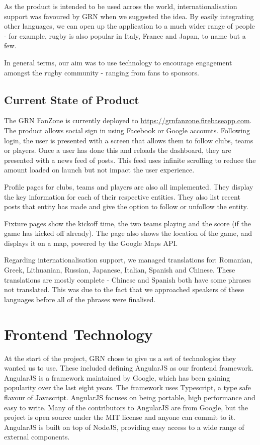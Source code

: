 \documentclass{l3proj}
\begin{document}
As the product is intended to be used across the world, internationalisation
 support was favoured by GRN when we suggested the idea. By easily integrating
 other languages, we can open up the application to a much wider range of people - for
 example, rugby is also popular in Italy, France and Japan, to name but a few.

In general terms, our aim was to use technology to encourage engagement amongst the
 rugby community - ranging from fans to sponsors.

\subsection{Current State of Product}
The GRN FanZone is currently deployed to \url{https://grnfanzone.firebaseapp.com}.
 The product allows social sign in using Facebook or Google accounts. Following
 login, the user is presented with a screen that allows them to follow clubs,
 teams or players. Once a user has done this and reloads the dashboard, they
 are presented with a news feed of posts. This feed uses infinite scrolling to 
 reduce the amount loaded on launch but not impact the user experience.
 
Profile pages for clubs, teams and players are also all implemented. They display
 the key information for each of their respective entities. They also list 
 recent posts that entity has made and give the option to follow or unfollow 
 the entity.
 
Fixture pages show the kickoff time, the two teams playing and the score (if the
 game has kicked off already). The page also shows the location of the game,
 and displays it on a map, powered by the Google Maps API.
 
Regarding internationalisation support, we managed translations for: Romanian,
 Greek, Lithuanian, Russian, Japanese, Italian, Spanish and Chinese. These 
 translations are mostly complete - Chinese and Spanish both have some phrases
 not translated. This was due to the fact that we approached speakers of these 
 languages before all of the phrases were finalised. 


\section{Frontend Technology} %
\label{sec:frontend}

At the start of the project, GRN chose to give us a set of technologies they
 wanted us to use. These included defining AngularJS as our frontend framework.
 AngularJS is a framework maintained by Google, which has been gaining popularity
 over the last eight years\cite{angularjsoverview}. The framework uses Typescript,
 a type safe flavour of Javascript. AngularJS focuses on being portable, high performance
 and easy to write\cite{angular_features}. Many of the contributors to AngularJS are
 from Google, but the project is open source under the MIT license and anyone can
 commit to it\cite{angularjsoverview}. AngularJS is built on top of NodeJS, providing
 easy access to a wide range of external components.
\end{document}
